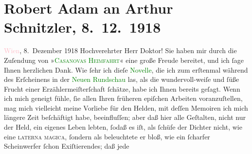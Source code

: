 

               \section[Robert Adam an Arthur Schnitzler, 8. 12. 1918]{ Robert Adam an Arthur Schnitzler, 8. 12. 1918}\nopagebreak{}\rehead{ }\normalsize\beginnumbering{} \toendnotes[C]{\smallbreak\pagebreak[2]} 
\toendnotes[C]{\smallbreak}\pstart
           \raggedleft{}{\pb}\textcolor{pink}{Wien}{}\ledrightnote{\textcolor{pink}{Wien}}, 8. Dezember 1918\pend
           \pstart\center{}Hochverehrter Herr Doktor!\pend\pstart
           Sie haben mir durch die Zuſendung von »\textcolor{green}{\textsc{Casanovas Heimfahrt}}{}\ledrightnote{\textcolor{green}{Casanovas Heimfahrt}}« eine große Freude bereitet, und ich ſage Ihnen herzlichen Dank. Wie ſehr
                    ich dieſe \textcolor{green}{Novelle}{}, die ich
                    zum erſtenmal während des Erſcheinens in der \textcolor{green}{Neuen
                        Rundschau}{}\ledrightnote{\textcolor{green}{Die neue Rundschau}} las, als die wundervoll-weiſe und ſüße Frucht einer
                    Erzählermeiſterſchaft ſchätze, habe ich Ihnen bereits geſagt. Wenn ich mich
                    geneigt fühle, ſie allen Ihren früheren epiſchen Arbeiten voranzuſtellen, mag
                    mich vielleicht meine Vorliebe für den Helden, mit deſſen Memoiren ich mich
                    längere Zeit beſchäftigt habe, beeinfluſſen; aber daß hier alle Geſtalten, nicht
                    nur der Held, ein eigenes Leben lebten, ſodaß es iſt, als ſchüfe der Dichter
                    nicht, wie eine \textsc{laterna magica}, ſondern als
                    beleuchtete er bloß, wie ein ſcharfer Scheinwerfer ſchon Exiſtierendes; daß jede
